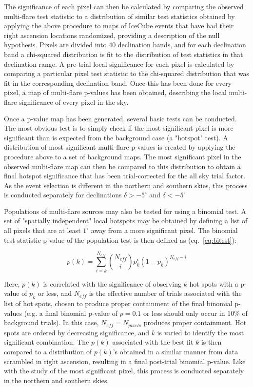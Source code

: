 The significance of each pixel can then be calculated by comparing the observed multi-flare test statistic to a distribution of similar test statistics obtained by applying the above procedure to maps of IceCube events that have had their right ascension locations randomized, providing a description of the null hypothesis. Pixels are divided into 40 declination bands, and for each declination band a chi-squared distribution is fit to the distribution of test statistics in that declination range. A pre-trial local significance for each pixel is calculated by comparing a particular pixel test statistic to the chi-squared distribution that was fit in the corresponding declination band. Once this has been done for every pixel, a map of multi-flare p-values has been obtained, describing the local multi-flare significance of every pixel in the sky.

Once a p-value map has been generated, several basic tests can be conducted. The most obvious test is to simply check if the most significant pixel is more significant than is expected from the background case (a "hotspot" test). A distribution of most significant multi-flare p-values is created by applying the procedure above to a set of background maps. The most significant pixel in the observed multi-flare map can then be compared to this distribution to obtain a final hotspot significance that has been trial-corrected for the all sky trial factor. As the event selection is different in the northern and southern skies, this process is conducted separately for declinations $\delta>-5^{\circ}$ and $\delta<-5^{\circ}$

Populations of multi-flare sources may also be tested for using a binomial test. A set of "spatially independent" local hotspots may be obtained by defining a list of all pixels that are at least $1^{\circ}$ away from a more significant pixel. The binomial test statistic p-value of the population test is then defined as (eq.~\ref{eq:bitest}):

\begin{equation}
    p(k) = \sum_{i=k}^{N_{eff}} \binom{N_{eff}}{i}p_k^i(1-p_k)^{N_{eff}-i}
    \label{eq:bitest}
\end{equation}

Here, $p(k)$ is correlated with the significance of observing $k$ hot spots with a p-value of $p_k$ or less, and $N_{eff}$ is the effective number of trials associated with the list of hot spots, chosen to produce proper containment of the final binomial p-values (e.g. a final binomial p-value of $p=0.1$ or less should only occur in 10\% of background trials). In this case, $N_{eff}=N_{pixels}$ produces proper containment. Hot spots are ordered by decreasing significance, and $k$ is varied to identify the most significant combination. The $p(k)$ associated with the best fit $k$ is then compared to a distribution of $p(k)$'s obtained in a similar manner from data scrambled in right ascension, resulting in a final post-trial binomial p-value. Like with the study of the most significant pixel, this process is conducted separately in the northern and southern skies. 


